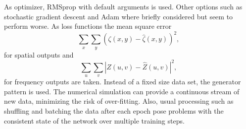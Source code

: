 \documentclass[sigconf]{acmart}
\begin{document}
As optimizer, RMSprop with default arguments \cite{RMSprop} is used. Other options such as stochastic gradient descent and Adam where briefly considered but seem to perform worse. As loss functions the mean square error 
\begin{equation}
	\sum_{x}\sum_{y} (\zeta(x,y) - \hat{\zeta}(x,y))^2,
\end{equation}
for spatial outputs and
\begin{equation}
\sum_{u}\sum_{v} |Z(u,v) - \hat{Z}(u,v)|^2,
\end{equation} for frequency outputs are taken.
Instead of a fixed size data set, the generator pattern is used. The numerical simulation can provide a continuous stream of new data, minimizing the risk of over-fitting. Also, usual processing such as shuffling and batching the data after each epoch pose problems with the consistent state of the network over multiple training steps.
\end{document}
